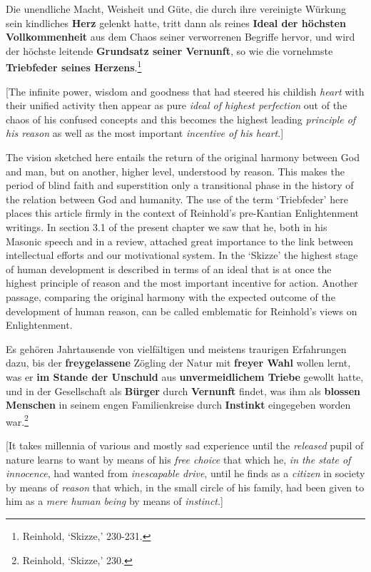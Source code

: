 Die unendliche Macht, Weisheit und G\"{u}te, die durch ihre vereinigte W\"{u}rkung sein kindliches \textbf{Herz} gelenkt hatte, tritt dann als reines \textbf{Ideal der h\"{o}chsten Vollkommenheit} aus dem Chaos seiner verworrenen Begriffe hervor, und wird der h\"{o}chste leitende \textbf{Grundsatz seiner Vernunft}, so wie die vornehmste \textbf{Triebfeder seines Herzens}.\footnote{ Reinhold, `Skizze,' 230{-}231.}

[The infinite power, wisdom and goodness that had steered his childish \textit{heart} with their unified activity then appear as pure \textit{ideal of highest perfection} out of the chaos of his confused concepts and this becomes the highest leading \textit{principle of his reason} as well as the most important \textit{incentive of his heart}.] 

The vision sketched here entails the return of the original harmony between God and man, but on another, higher level, understood by reason. This makes the period of blind faith and superstition only a transitional phase in the history of the relation between God and humanity. The use of the term `Triebfeder' here places this article firmly in the context of Reinhold's pre{-}Kantian Enlightenment writings. In section 3.1 of the present chapter we saw that he, both in his Masonic speech and in a review, attached great importance to the link between intellectual efforts and our motivational system. In the `Skizze' the highest stage of human development is described in terms of an ideal that is at once the highest principle of reason and the most important incentive for action. Another passage, comparing the original harmony with the expected outcome of the development of human reason, can be called emblematic for Reinhold's views on Enlightenment. 

Es geh\"{o}ren Jahrtausende von vielf\"{a}ltigen und meistens traurigen Erfahrungen dazu, bis der \textbf{freygelassene} Z\"{o}gling der Natur mit \textbf{freyer Wahl} wollen lernt, was er \textbf{im Stande der Unschuld }aus \textbf{unvermeidlichem Triebe} gewollt hatte, und in der Gesellschaft als \textbf{B\"{u}rger} durch \textbf{Vernunft} findet, was ihm als \textbf{blossen Menschen} in seinem engen Familienkreise durch \textbf{Instinkt} eingegeben worden war.\footnote{ Reinhold, `Skizze,' 230.}

[It takes millennia of various and mostly sad experience until the \textit{released} pupil of nature learns to want by means of his \textit{free choice} that which he, \textit{in the state of innocence}, had wanted from \textit{inescapable drive}, until he finds as a \textit{citizen} in society by means of \textit{reason} that which, in the small circle of his family, had been given to him as a \textit{mere human being} by means of \textit{instinct}.]

